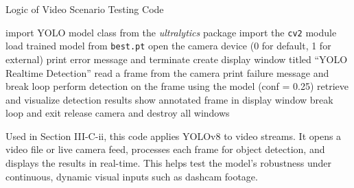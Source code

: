 \documentclass[journal,transmag]{IEEEtran}
\begin{document}
\vspace{-0.5em}
\begin{algorithm}[H]
\caption{Logic of Video Scenario Testing Code}
\begin{algorithmic}[1]
\STATE import YOLO model class from the \textit{ultralytics} package
\STATE import the \texttt{cv2} module
\STATE load trained model from \texttt{best.pt}
\STATE open the camera device (0 for default, 1 for external)
    \STATE print error message and terminate
\ENDIF
\STATE create display window titled ``YOLO Realtime Detection''
    \STATE read a frame from the camera
        \STATE print failure message and break loop
    \ENDIF
    \STATE perform detection on the frame using the model ({conf = 0.25})
    \STATE retrieve and visualize detection results
    \STATE show annotated frame in display window
        \STATE break loop and exit
    \ENDIF
\ENDWHILE
\STATE release camera and destroy all windows
\end{algorithmic}
\end{algorithm}
\vspace{-5em}
Used in Section III-C-ii, this code applies YOLOv8 to video streams. It opens a video file or live camera feed, processes each frame for object detection, and displays the results in real-time. This helps test the model's robustness under continuous, dynamic visual inputs such as dashcam footage.
\vspace{13em}
\end{document}

